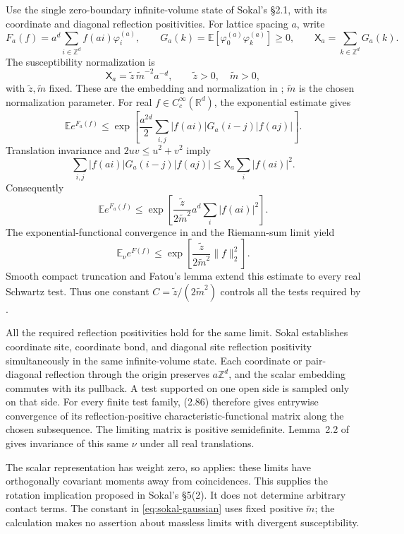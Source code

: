 \documentclass[11pt, letterpaper, reqno]{amsart}
\theoremstyle{definition}
\theoremstyle{remark}
\newcommand{\bbE}{\mathbb{E}}
\newcommand{\bbR}{\mathbb{R}}
\newcommand{\bbZ}{\mathbb{Z}}
\begin{document}
Use the single zero-boundary infinite-volume state of Sokal's \S2.1,
with its coordinate and diagonal reflection positivities. For lattice
spacing $a$, write
\[
 F_a(f)=a^d\sum_{i\in\bbZ^d}f(ai)\varphi_i^{(a)},\qquad
 G_a(k)=\bbE[\varphi_0^{(a)}\varphi_k^{(a)}]\geq0,\qquad
 \mathsf X_a=\sum_{k\in\bbZ^d}G_a(k).
\]
The susceptibility normalization is
\[
 \mathsf X_a=\widetilde z\,\widetilde m^{-2}a^{-d},
 \qquad\widetilde z>0,\quad\widetilde m>0,
\]
with $\widetilde z,\widetilde m$ fixed. These are the embedding and
normalization in \cite[(2.81), (2.83)]{Sokal}; $\widetilde m$ is the
chosen normalization parameter. For real $f\in C_c^\infty(\bbR^d)$,
the exponential estimate \cite[(2.27)]{Sokal} gives
\[
 \bbE e^{F_a(f)}
 \leq\exp\left[\frac{a^{2d}}2
       \sum_{i,j}|f(ai)|G_a(i-j)|f(aj)|\right].
\]
Translation invariance and $2uv\leq u^2+v^2$ imply
\[
 \sum_{i,j}|f(ai)|G_a(i-j)|f(aj)|
 \leq\mathsf X_a\sum_i|f(ai)|^2.
\]
Consequently
\[
 \bbE e^{F_a(f)}
 \leq\exp\left[\frac{\widetilde z}{2\widetilde m^2}
                      a^d\sum_i|f(ai)|^2\right].
\]
The exponential-functional convergence in \cite[(2.86)]{Sokal} and
the Riemann-sum limit yield
\begin{equation}\label{eq:sokal-gaussian}
 \bbE_\nu e^{F(f)}
 \leq\exp\left[\frac{\widetilde z}{2\widetilde m^2}\|f\|_2^2\right].
\end{equation}
Smooth compact truncation and Fatou's lemma extend this estimate to
every real Schwartz test. Thus one constant
$C=\widetilde z/(2\widetilde m^2)$ controls all the tests required by
.

All the required reflection positivities hold for the same limit.
Sokal \cite[p.~328, item~(l), and p.~329]{Sokal} establishes coordinate
site, coordinate bond, and diagonal site reflection positivity
simultaneously in the same infinite-volume state. Each coordinate or
pair-diagonal reflection through the origin preserves $a\bbZ^d$, and
the scalar embedding commutes with its pullback. A test supported on
one open side is sampled only on that side. For every finite test
family, (2.86) therefore gives entrywise convergence of its
reflection-positive characteristic-functional matrix along the chosen
subsequence. The limiting matrix is positive semidefinite. Lemma~2.2
of \cite{Sokal} gives invariance of this same $\nu$ under all real
translations.

The scalar representation has weight zero, so  applies:
these limits have orthogonally covariant moments away from coincidences.
This supplies the rotation implication proposed in Sokal's \S5(2).
It does not determine arbitrary contact terms. The constant in
\eqref{eq:sokal-gaussian} uses fixed positive $\widetilde m$; the
calculation makes no assertion about massless limits with divergent
susceptibility.
\end{document}
